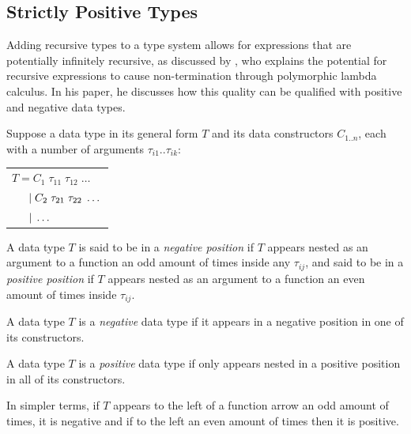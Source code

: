 \subsection{Strictly Positive Types}

Adding recursive types to a type system allows for expressions that are potentially infinitely recursive,
as discussed by \citet{RecursiveTypesForFree}, who explains the potential for recursive expressions
to cause non-termination through polymorphic lambda calculus. In his paper, he discusses how this
quality can be qualified with positive and negative data types.

Suppose a data type in its general form $T$ and its data constructors $C_{1..n}$, each with a number of arguments 
$\tau_{i1}..\tau_{ik}$:

\begin{center}
    \begin{tabular}{l}
        $T = C_1\; \tau_{11} \; \tau_{12} \; \dots$ \\
        $\hspace{1.5em} \vert\; C_2\; \tau_{21} \; \tau_{22} \; \dots$ \\
        $\hspace{1.5em} \vert\; \dots$ \\
    \end{tabular} 
\end{center}

\theoremstyle{definition}
\begin{definition}
    A data type $T$ is said to be in a \textit{negative position} if $T$ appears nested as an argument
    to a function an odd amount of times inside any $\tau_{ij}$, and said to be in a \textit{positive position}
    if $T$ appears nested as an argument to a function an even amount of times inside $\tau_{ij}$.
\end{definition}

\theoremstyle{definition}
\begin{definition}
    A data type $T$ is a \textit{negative} data type if it appears in a negative position 
    in one of its constructors.
\end{definition}

\theoremstyle{definition}
\begin{definition}
    A data type $T$ is a \textit{positive} data type if only appears nested in a positive position
    in all of its constructors.
\end{definition}

In simpler terms, if $T$ appears to the left of a function arrow an odd amount of times, it is negative and if
to the left an even amount of times then it is positive.

